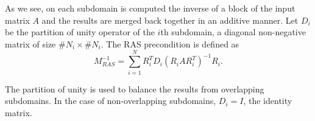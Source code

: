 As we see, on each subdomain is computed the inverse of a block of the input matrix \(A\) and the results are merged back together in an additive manner.
Let \(D_i\) be the partition of unity operator of the \(i\)th subdomain, a diagonal non-negative matrix of size \(\#N_i \times \#N_i\).
The RAS precondition is defined as
\[M^{-1}_{RAS} = \sum^N_{i=1} R_i^T D_i (R_i A R_i^T)^{-1} R_i.\]

The partition of unity is used to balance the results from overlapping subdomains.
In the case of non-overlapping subdomains, \(D_i = I\), the identity matrix.
